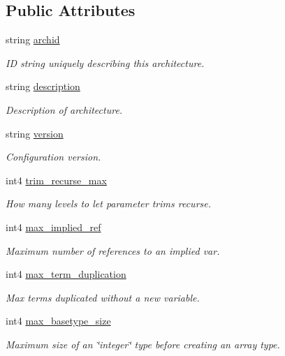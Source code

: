 \subsection*{Public Attributes}
\begin{DoxyCompactItemize}
\item 
string \mbox{\hyperlink{class_architecture_a78260a0e141deda850d56d17e6e728cf}{archid}}
\begin{DoxyCompactList}\small\item\em ID string uniquely describing this architecture. \end{DoxyCompactList}\item 
string \mbox{\hyperlink{class_architecture_ad7765062ff51f487874d768e763b82d0}{description}}
\begin{DoxyCompactList}\small\item\em Description of architecture. \end{DoxyCompactList}\item 
string \mbox{\hyperlink{class_architecture_a9fa6f1ec97e17635fb65b30c3b734efb}{version}}
\begin{DoxyCompactList}\small\item\em Configuration version. \end{DoxyCompactList}\item 
int4 \mbox{\hyperlink{class_architecture_adbb294ba6c3bb21f691e0208c1ac53a1}{trim\+\_\+recurse\+\_\+max}}
\begin{DoxyCompactList}\small\item\em How many levels to let parameter trims recurse. \end{DoxyCompactList}\item 
int4 \mbox{\hyperlink{class_architecture_a6c32c1c7e592435d70f41145d5c548f1}{max\+\_\+implied\+\_\+ref}}
\begin{DoxyCompactList}\small\item\em Maximum number of references to an implied var. \end{DoxyCompactList}\item 
int4 \mbox{\hyperlink{class_architecture_a99db0ca5ac8e5c9edfa7515f97b2ab5a}{max\+\_\+term\+\_\+duplication}}
\begin{DoxyCompactList}\small\item\em Max terms duplicated without a new variable. \end{DoxyCompactList}\item 
int4 \mbox{\hyperlink{class_architecture_a37de4bf5cb39955f32a24074e768a591}{max\+\_\+basetype\+\_\+size}}
\begin{DoxyCompactList}\small\item\em Maximum size of an \char`\"{}integer\char`\"{} type before creating an array type. \end{DoxyCompactList}\item 

\end{DoxyCompactItemize}
